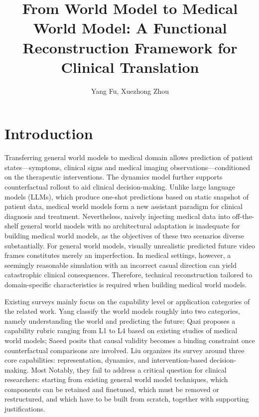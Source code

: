 \documentclass{article}
\title{From World Model to Medical World Model: A Functional Reconstruction Framework for Clinical Translation}
\author{Yang Fu, Xuezhong Zhou}
\date{}
\begin{document}
\maketitle

\begin{abstract}

\end{abstract}

\section{Introduction}

Transferring general world models to medical domain allows prediction of patient states---symptoms, clinical signs and medical imaging observations---conditioned on the therapeutic interventions. The dynamics model further supports counterfactual rollout to aid clinical decision-making. Unlike large language models (LLMs), which produce one-shot predictions based on static snapshot of patient data, medical world models form a new assistant paradigm for clinical diagnosis and treatment\cite{yang2025medicalworldmodelgenerative}. Nevertheless, naively injecting medical data into off-the-shelf general world models with no architectural adaptation is inadequate for building medical world models, as the objectives of these two scenarios diverse substantially. For general world models, visually unrealistic predicted future video frames\cite{bruce2024geniegenerativeinteractiveenvironments} constitutes merely an imperfection. In medical settings, however, a seemingly reasonable simulation with an incorrect casual direction can yield catastrophic clinical consequences. Therefore, technical reconstruction tailored to domain-specific characteristics is required when building medical world models.

Existing surveys mainly focus on the capability level or application categories of the related work. Yang \cite{ding2025understandingworldpredictingfuture} classify the world models roughly into two categories, namely understanding the world and predicting the future; Qazi \cite{qazi2025generativeaiworldmodels} proposes a capability rubric ranging from L1 to L4 based on existing studies of medical world models; Saeed \cite{202604.2168}
posits that causal validity becomes a binding constraint once counterfactual comparisons are involved. Liu \cite{liu2026medicalworldmodelsrepresenting} organizes its survey around three core capabilities: representation, dynamics, and intervention-based decision-making. Most Notably, they fail to address a critical question for clinical researchers: starting from existing general world model techniques, which components can be retained and finetuned, which must be removed or restructured, and which have to be built from scratch, together with supporting justifications.
\end{document}
